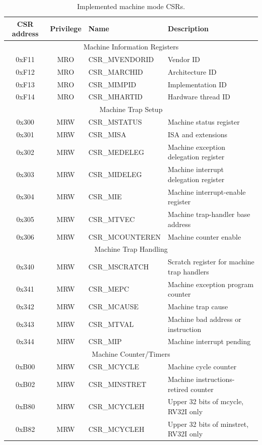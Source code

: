 \documentclass[../main.tex]{subfiles}
\begin{document}
\begin{table}[h]
\centering
\begin{tabular}{|c|c|p{3.5cm}| p{6.2cm}|} 
\hline
CSR address & Privilege & Name & Description \\
\hline
\multicolumn{4}{|c|}{Machine Information Registers}\\
\hline
0xF11 & MRO & CSR\_MVENDORID & Vendor ID \\ 
0xF12 & MRO & CSR\_MARCHID & Architecture ID \\ 
0xF13 & MRO & CSR\_MIMPID &  Implementation ID\\ 
0xF14 & MRO & CSR\_MHARTID & Hardware thread ID\\
\hline
\multicolumn{4}{|c|}{Machine Trap Setup}\\
\hline
0x300 & MRW & CSR\_MSTATUS & Machine status register\\
0x301 & MRW & CSR\_MISA & ISA and extensions\\
0x302 & MRW & CSR\_MEDELEG & Machine exception delegation register\\
0x303 & MRW & CSR\_MIDELEG & Machine interrupt delegation register\\
0x304 & MRW & CSR\_MIE & Machine interrupt-enable register\\
0x305 & MRW & CSR\_MTVEC & Machine trap-handler base address\\
0x306 & MRW & CSR\_MCOUNTEREN & Machine counter enable\\
\hline
\multicolumn{4}{|c|}{Machine Trap Handling}\\
\hline
0x340 & MRW & CSR\_MSCRATCH & Scratch register for machine trap handlers\\
0x341 & MRW & CSR\_MEPC & Machine exception program counter\\
0x342 & MRW & CSR\_MCAUSE & Machine trap cause\\
0x343 & MRW & CSR\_MTVAL & Machine bad address or instruction\\
0x344 & MRW & CSR\_MIP & Machine interrupt pending\\
\hline
\multicolumn{4}{|c|}{Machine Counter/Timers}\\
\hline
0xB00 & MRW & CSR\_MCYCLE & Machine cycle counter\\
0xB02 & MRW & CSR\_MINSTRET & Machine instructions-retired counter\\
0xB80 & MRW & CSR\_MCYCLEH & Upper 32 bits of mcycle, RV32I only\\
0xB82 & MRW & CSR\_MCYCLEH & Upper 32 bits of minstret, RV32I only\\
\hline
\end{tabular}
\caption{Implemented machine mode CSRs.}
\label{tab:machine_CSRs}
\end{table}
\end{document}
